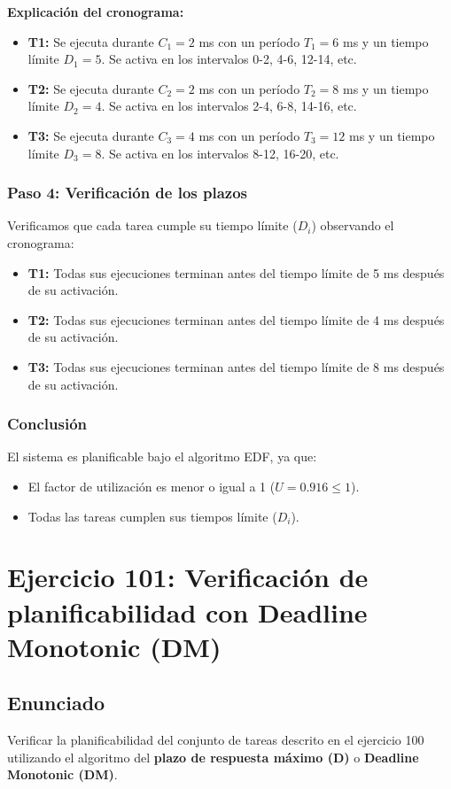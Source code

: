 \documentclass[a4paper,12pt]{article}
\begin{document}
\textbf{Explicación del cronograma:}
\begin{itemize}
    \item \textbf{T1:} Se ejecuta durante \(C_1 = 2\) ms con un período \(T_1 = 6\) ms y un tiempo límite \(D_1 = 5\). Se activa en los intervalos 0-2, 4-6, 12-14, etc.
    \item \textbf{T2:} Se ejecuta durante \(C_2 = 2\) ms con un período \(T_2 = 8\) ms y un tiempo límite \(D_2 = 4\). Se activa en los intervalos 2-4, 6-8, 14-16, etc.
    \item \textbf{T3:} Se ejecuta durante \(C_3 = 4\) ms con un período \(T_3 = 12\) ms y un tiempo límite \(D_3 = 8\). Se activa en los intervalos 8-12, 16-20, etc.
\end{itemize}

\subsubsection{Paso 4: Verificación de los plazos}
Verificamos que cada tarea cumple su tiempo límite (\(D_i\)) observando el cronograma:
\begin{itemize}
    \item \textbf{T1:} Todas sus ejecuciones terminan antes del tiempo límite de 5 ms después de su activación.
    \item \textbf{T2:} Todas sus ejecuciones terminan antes del tiempo límite de 4 ms después de su activación.
    \item \textbf{T3:} Todas sus ejecuciones terminan antes del tiempo límite de 8 ms después de su activación.
\end{itemize}

\subsubsection{Conclusión}
El sistema es planificable bajo el algoritmo EDF, ya que:
\begin{itemize}
    \item El factor de utilización es menor o igual a 1 (\(U = 0.916 \leq 1\)).
    \item Todas las tareas cumplen sus tiempos límite (\(D_i\)).
\end{itemize}


\section{Ejercicio 101: Verificación de planificabilidad con Deadline Monotonic (DM)}
\subsection{Enunciado}
Verificar la planificabilidad del conjunto de tareas descrito en el ejercicio 100 utilizando el algoritmo del \textbf{plazo de respuesta máximo (D)} o \textbf{Deadline Monotonic (DM)}.
\end{document}
